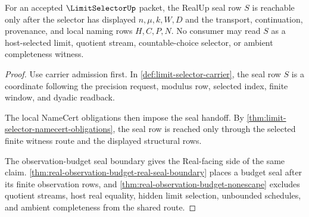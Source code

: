 \begin{theorem}
\label{thm:limit-selector-real-seal-nonescape}
For an accepted $\LimitSelectorUp$ packet, the RealUp seal row $S$ is reachable only after the selector has displayed $n,\mu,k,W,D$ and the transport, continuation, provenance, and local naming rows $H,C,P,N$. No consumer may read $S$ as a host-selected limit, quotient stream, countable-choice selector, or ambient completeness witness.
\end{theorem}
\begin{proof}
Use carrier admission first. In \autoref{def:limit-selector-carrier}, the seal row $S$ is a coordinate following the precision request, modulus row, selected index, finite window, and dyadic readback.

The local NameCert obligations then impose the seal handoff. By \autoref{thm:limit-selector-namecert-obligations}, the seal row is reached only through the selected finite witness route and the displayed structural rows.

The observation-budget seal boundary gives the Real-facing side of the same claim. \autoref{thm:real-observation-budget-real-seal-boundary} places a budget seal after its finite observation rows, and \autoref{thm:real-observation-budget-nonescape} excludes quotient streams, host real equality, hidden limit selection, unbounded schedules, and ambient completeness from the shared route.
\end{proof}

